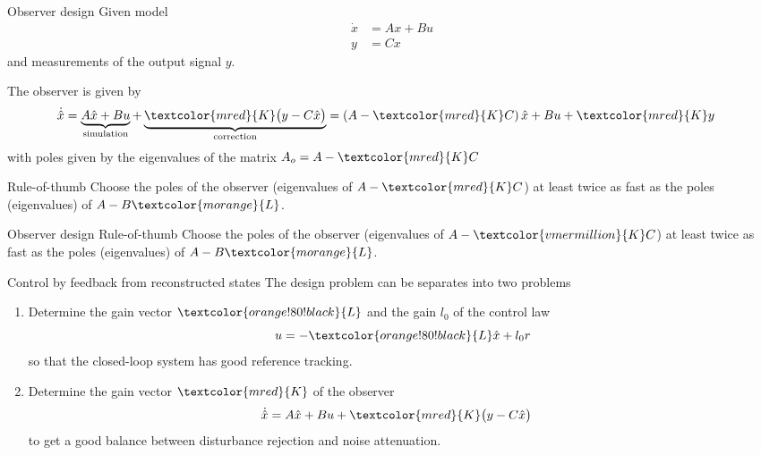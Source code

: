 \documentclass[presentation,aspectratio=169]{beamer}
\begin{document}
\begin{frame}[label={sec:orgd40e8ca}]{Observer design}
Given model
 \begin{equation*}
 \begin{split}
  \dot{x} &= A x + B u\\
  y &= C x
 \end{split}
 \label{eq:ssmodel}
\end{equation*}
and measurements of the output signal \(y\). 

The observer is given by
\begin{equation*}
\begin{split}
\dot{\hat{x}} &= \underbrace{A \hat{x} + B u{}}_{\text{simulation}} + \underbrace{\textcolor{mred}{K}\big(y - C\hat{x}\big)}_{\text{correction}} = \left(A - \textcolor{mred}{K}C\right)\hat{x} +  B u{} + \textcolor{mred}{K}y
\end{split}
\end{equation*}
with poles given by the eigenvalues of the matrix \(A_o = A - \textcolor{mred}{K}C\)

\alert{Rule-of-thumb} Choose the poles of the observer (eigenvalues of \(A-\textcolor{mred}{K}C\)) at least twice as fast as the poles (eigenvalues) of \(A-B \textcolor{morange}{L}\).
\end{frame}

\begin{frame}[label={sec:orgf937913}]{Observer design}
\alert{Rule-of-thumb} Choose the poles of the observer (eigenvalues of \(A-\textcolor{vmermillion}{K}C\)) at least twice as fast as the poles (eigenvalues) of \(A-B \textcolor{morange}{L}\).
\end{frame}


\begin{frame}[label={sec:org54e87b4}]{Control by feedback from reconstructed states}
The design problem can be separates into two problems
\begin{enumerate}
\item Determine the gain vector \(\textcolor{orange!80!black}{L}\) and the gain \(l_0\) of the control law
\[ u{} = -\textcolor{orange!80!black}{L} \hat{x} + l_0 r\]
so that the closed-loop system has good reference tracking.
\item Determine the gain vector \(\textcolor{mred}{K}\) of the observer
\begin{equation*}
\begin{split}
\dot{\hat{x}} &= A \hat{x} + B u{} + \textcolor{mred}{K} \big(y - C\hat{x}\big)
\end{split}
\end{equation*}
to get a good balance between disturbance rejection and noise attenuation.
\end{enumerate}
\end{frame}
\end{document}
